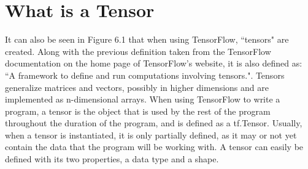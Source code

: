 \documentclass[12pt]{report} %
\begin{document}
\section{What is a Tensor}
	It can also be seen in Figure 6.1 that when using TensorFlow, ``tensors" are created. Along with the previous definition taken from the TensorFlow documentation on the home page of TensorFlow's website, it is also defined as: ``A framework to define and run computations involving tensors."\cite{tensorFlow}. Tensors generalize matrices and vectors, possibly in higher dimensions and are implemented as n-dimensional arrays. When using TensorFlow to write a program, a tensor is the object that is used by the rest of the program throughout the duration of the program, and is defined as a tf.Tensor. Usually, when a tensor is instantiated, it is only partially defined, as it may or not yet contain the data that the program will be working with. A tensor can easily be defined with its two properties, a data type and a shape\cite{tensorFlow}.
	
\end{document}
